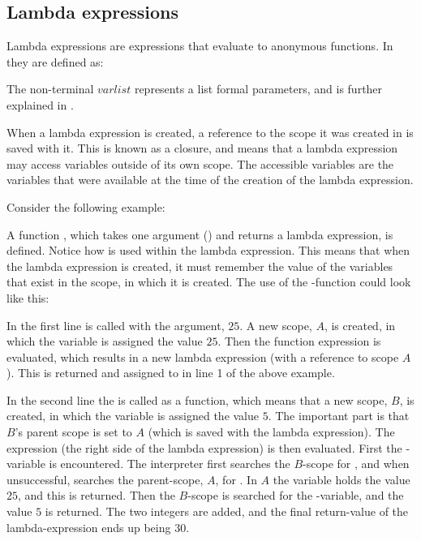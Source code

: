 \subsection{Lambda expressions}
\label{sec:lambdaexpressions}

Lambda expressions are expressions that evaluate to anonymous functions. In
\productname{} they are defined as:

\begin{ebnf}
\end{ebnf}

The non-terminal $varlist$ represents a list formal parameters, and is further
explained in .

When a lambda expression is created, a reference to the scope it was created in
is saved with it. This is known as a closure, and means that a lambda
expression may access variables outside of its own scope. The accessible
variables are the variables that were available at the time of the creation of
the lambda expression.

Consider the following example:


A function , which takes one argument () and
returns a lambda expression, is defined. Notice how  is used within
the lambda expression. This means that when the lambda expression is created, it
must remember the value of the variables that exist in the scope, in which it is
created. The use of the -function could look like this:


In the first line  is called with the argument, $25$. A new
scope, $A$, is created, in which the variable  is assigned the value
$25$. Then the function expression is evaluated, which results in a new lambda
expression (with a reference to scope $A$).  This is returned and assigned to
 in line 1 of the above example.

In the second line the  is called as a function, which means
that a new scope, $B$, is created, in which the variable  is
assigned the value $5$. The important part is that $B$'s parent scope is set to
$A$ (which is saved with the lambda expression). The expression (the right side
of the lambda expression) is then evaluated. First the -variable is
encountered. The interpreter first searches the $B$-scope for , and
when unsuccessful, searches the parent-scope, $A$, for . In $A$ the
variable  holds the value $25$, and this is returned. Then the
$B$-scope is searched for the -variable, and the value $5$ is
returned. The two integers are added, and the final return-value of the
lambda-expression ends up being $30$.

